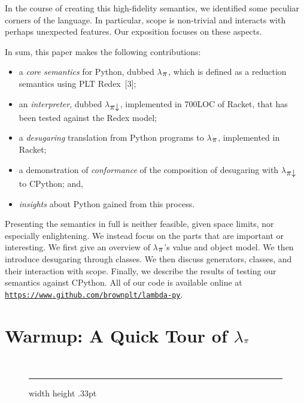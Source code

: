 \documentclass[10pt]{sigplanconf}
\newcommand{\sectionNewpage}{}
\newcommand{\textsub}[1]{$_{\hbox{\textsmaller{#1}}}$}
\newcommand{\Larger}[1]{\textlarger{#1}}
\newlength{\stabLeft}
\newcommand{\atItemizeStart}[0]{\addtolength{\stabLeft}{\labelsep}
                                \addtolength{\stabLeft}{\labelwidth}}
\let\SOriginalthesubsection\thesubsection
\newcommand{\Ssection}[2]{\section[#1]{#2}\let\thesubsection\SOriginalthesubsection}
\newcommand{\Snolinkurl}[1]{\nolinkurl{#1}}
\newcommand{\Legend}[1]{~

                        \hrule width \hsize height .33pt
                        \vspace{4pt}
                        \legend{#1}}
\newcommand{\FigureTarget}[2]{#1}
\newlength{\FigOrigskip}
\newenvironment{Figure}{\begin{figure}}{\end{figure}}
\newenvironment{Centerfigure}{\begin{Xfigure}\centering\item}{\end{Xfigure}}
\newenvironment{Xfigure}{\begin{list}{}{\leftmargin=0pt\topsep=0pt\parsep=\FigOrigskip\partopsep=0pt}}{\end{list}}
\newenvironment{FigureInside}{}{}
\newcommand{\Centertext}[1]{\begin{center}#1\end{center}}
\begin{document}
In the course of creating this high{-}fidelity semantics, we
identified some peculiar corners of the language.
In particular, scope is
non{-}trivial and interacts with perhaps unexpected features. Our
exposition focuses on these aspects.

In sum, this paper makes the following contributions:


\noindent \begin{itemize}\atItemizeStart

\item a \textit{core semantics} for Python, dubbed $\lambda$\textsub{\Larger{$\pi$}}, which
is defined as a reduction semantics using PLT Redex~[3];

\item an \textit{interpreter}, dubbed $\lambda$\textsub{\Larger{$\pi$$\downarrow$}}, implemented in
700LOC of Racket, that has been tested against the Redex model;

\item a \textit{desugaring} translation from Python programs to $\lambda$\textsub{\Larger{$\pi$}},
implemented in Racket;

\item a demonstration of \textit{conformance} of the composition of
desugaring with $\lambda$\textsub{\Larger{$\pi$$\downarrow$}} to CPython; and,

\item \textit{insights} about Python gained from this process.\end{itemize}

Presenting the semantics in full is neither feasible, given space
limits, nor especially enlightening. We instead focus on the parts
that are important or interesting. We first give an overview of
$\lambda$\textsub{\Larger{$\pi$}}{'}s value and object model. We then introduce desugaring
through classes. We then discuss generators,
classes, and their interaction with scope. Finally, we describe the
results of testing our semantics against CPython.  All of our code
is available online at \href{https://www.github.com/brownplt/lambda-py}{\Snolinkurl{https://www.github.com/brownplt/lambda-py}}.

\sectionNewpage

\Ssection{Warmup: A Quick Tour of $\lambda$\textsub{\Larger{$\pi$}}}{Warmup: A Quick Tour of $\lambda$\textsub{\Larger{$\pi$}}}\label{t:x28part_x22sx3awarmupx22x29}

\begin{Figure}\begin{Centerfigure}\begin{FigureInside}\end{FigureInside}\end{Centerfigure}

\Centertext{\Legend{\FigureTarget{\label{t:x28counter_x28x22figurex22_x22fx3aexprsx22x29x29}Figure~1: }{t:x28counter_x28x22figurex22_x22fx3aexprsx22x29x29}$\lambda$\textsub{\Larger{$\pi$}} expressions}}\end{Figure}
\end{document}
